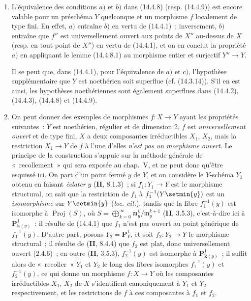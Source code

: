 \begin{remarks}[14.4.10]
\label{IV.14.4.10-fr}
\begin{enumerate}[label=(\roman*)]
  \item L'équivalence des conditions $a)$ et $b)$ dans (14.4.8) (resp. (14.4.9))
  est encore valable pour un préschéma $Y$ quelconque et un morphisme $f$
  localement de type fini. En effet, $a)$ entraîne $b)$ en vertu de (14.4.1)~;
  inversement, $b)$ entraîne que $f''$ est universellement ouvert aux points de
  $X''$ au-dessus de $X$ (resp. en tout point de $X''$) en vertu de (14.4.1), et
  on en conclut la propriété $a)$ en appliquant le lemme (14.4.8.1) au morphisme
  entier et surjectif $Y''\to Y$.

  Il se peut que, dans (14.4.1), pour l'équivalence de $a)$ et $c)$, l'hypothèse
  supplémentaire que $Y$ est noethérien soit superflue (cf. (14.3.14)). S'il en
  est ainsi, les hypothèses noethériennes sont également superflues dans (14.4.2),
  (14.4.3), (14.4.8) et (14.4.9).

  \item On peut donner des exemples de morphismes $f:X\to Y$ ayant les propriétés
  suivantes~: $Y$ est noethérien, régulier et de dimension 2, $f$ est
  \emph{universellement ouvert} et de type fini, $X$ a deux composantes
  irréductibles $X_1$, $X_2$, mais la restriction $X_1\to Y$ de $f$ à l'une
  d'elles \emph{n'est pas un morphisme ouvert}. Le principe de la construction
  s'appuie sur la méthode générale de «~recollement~» qui sera exposée au chap.~V,
  et ne peut donc qu'être esquissé ici. On part d'un point fermé $y$ de $Y$, et on
  considère le $Y$-schéma $Y_1$ obtenu en faisant \emph{éclater} $y$
  (\textbf{II}, 8.1.3)~; si $f_1:Y_1\to Y$ est le morphisme structural, on sait que
  la restriction de $f_1$ à $f_1^{-1}(Y\setmin\{y\})$ est un \emph{isomorphisme} sur
  $Y\setmin\{y\}$ (\emph{loc. cit.}), tandis que la fibre $f_1^{-1}(y)$ est isomorphe à
  $\operatorname{Proj}(S)$, où
  $S=\bigoplus_{k=0}^{\infty}\mathfrak m_y^k/\mathfrak m_y^{k+1}$
  (\textbf{II}, 3.5.3), c'est-à-dire ici à $\mathbf P^1_{\mathbf{k}(y)}$~: il résulte de
  (14.4.1) que $f_1$ n'est pas ouvert au point générique de $f_1^{-1}(y)$. D'autre
  part, posons $Y_2=\mathbf P^1_Y$, et soit $f_2:Y_2\to Y$ le morphisme structural~;
  il résulte de (\textbf{II}, 8.4.4) que $f_2$ est plat, donc universellement ouvert
  (2.4.6)~; en outre (\textbf{II}, 3.5.3), $f_2^{-1}(y)$ est isomorphe à
  $\mathbf P^1_{\mathbf{k}(y)}$~; il suffit alors de «~recoller~» $Y_1$ et $Y_2$ le long des
  fibres isomorphes $f_1^{-1}(y)$ et $f_2^{-1}(y)$, ce qui donne un morphisme
  $f:X\to Y$ où les composantes irréductibles $X_1$, $X_2$ de $X$ s'identifient
  canoniquement à $Y_1$ et $Y_2$ respectivement, et les restrictions de $f$ à ces
  composantes à $f_1$ et $f_2$.


\end{enumerate}
\end{remarks}
